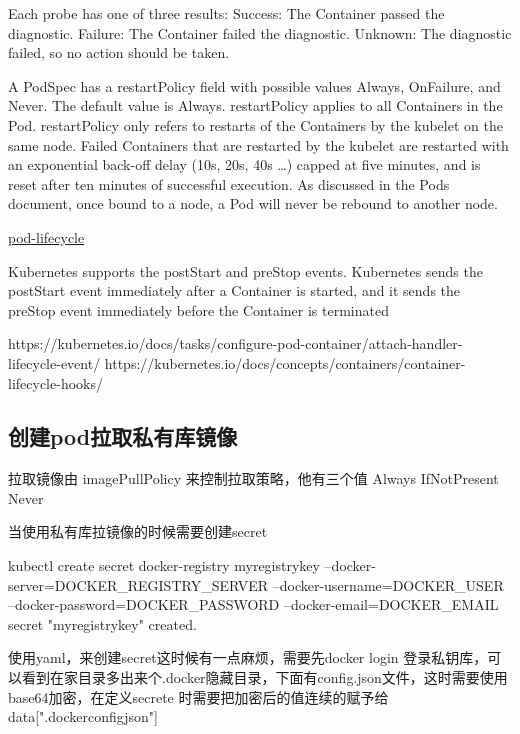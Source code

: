 Each probe has one of three results:
Success: The Container passed the diagnostic.
Failure: The Container failed the diagnostic.
Unknown: The diagnostic failed, so no action should be taken.

A PodSpec has a restartPolicy field with possible values Always, OnFailure, and Never. The default value is Always. restartPolicy applies to all Containers in the Pod. restartPolicy only refers to restarts of the Containers by the kubelet on the same node. Failed Containers that are restarted by the kubelet are restarted with an exponential back-off delay (10s, 20s, 40s …) capped at five minutes, and is reset after ten minutes of successful execution. As discussed in the Pods document, once bound to a node, a Pod will never be rebound to another node.


\href{https://kubernetes.io/docs/concepts/workloads/pods/pod-lifecycle/}{pod-lifecycle}

Kubernetes supports the postStart and preStop events. Kubernetes sends the postStart event immediately after a Container is started, and it sends the preStop event immediately before the Container is terminated

https://kubernetes.io/docs/tasks/configure-pod-container/attach-handler-lifecycle-event/
https://kubernetes.io/docs/concepts/containers/container-lifecycle-hooks/

\subsection{创建pod拉取私有库镜像}
拉取镜像由 imagePullPolicy 来控制拉取策略，他有三个值   Always IfNotPresent Never


当使用私有库拉镜像的时候需要创建secret 

kubectl create secret docker-registry myregistrykey --docker-server=DOCKER_REGISTRY_SERVER --docker-username=DOCKER_USER --docker-password=DOCKER_PASSWORD --docker-email=DOCKER_EMAIL
secret "myregistrykey" created.

使用yaml，来创建secret这时候有一点麻烦，需要先docker login 登录私钥库，可以看到在家目录多出来个.docker隐藏目录，下面有config.json文件，这时需要使用base64加密，在定义secrete 时需要把加密后的值连续的赋予给data[".dockerconfigjson"]

